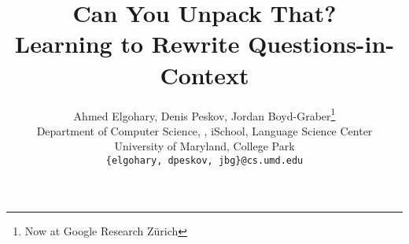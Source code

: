\documentclass[11pt,a4paper,table]{article}
\title{Can You Unpack That? \\ Learning to Rewrite Questions-in-Context}
\author{
 Ahmed Elgohary, Denis Peskov,  Jordan Boyd-Graber\thanks{\hspace{.25cm}Now at Google Research Z\"urich}\\
Department of Computer Science, \abr{umiacs}, iSchool, Language
Science Center \\
University of Maryland, College Park\\
  {\tt \{elgohary, dpeskov, jbg\}@cs.umd.edu}
}
\newcommand{\latexfile}[1]{}
\begin{document}
\maketitle

\begin{abstract}
  \latexfile{00-abstract}
\end{abstract}


\latexfile{10-intro.tex}
\latexfile{20-pp_task.tex}
\latexfile{30-dataset_collection.tex}
\latexfile{50-baselines.tex}
\latexfile{40-dataset_analysis.tex}
\latexfile{60-related_and_discussion.tex}
\latexfile{ack.tex}

\clearpage




\clearpage

\end{document}
